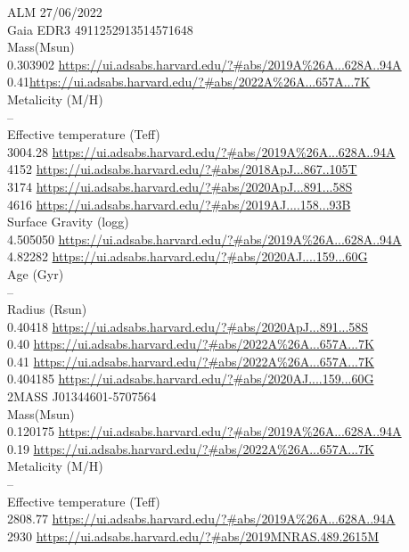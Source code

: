 ALM 27/06/2022\\
Gaia EDR3 4911252913514571648\\
Mass(Msun)\\
0.303902 \url{https://ui.adsabs.harvard.edu/?#abs/2019A%26A...628A..94A}\\
0.41\url{https://ui.adsabs.harvard.edu/?#abs/2022A%26A...657A...7K}\\
Metalicity (M/H)\\
--\\
Effective temperature (Teff) \\
3004.28 \url{https://ui.adsabs.harvard.edu/?#abs/2019A%26A...628A..94A}\\
4152 \url{https://ui.adsabs.harvard.edu/?#abs/2018ApJ...867..105T}\\
3174 \url{https://ui.adsabs.harvard.edu/?#abs/2020ApJ...891...58S}\\
4616 \url{https://ui.adsabs.harvard.edu/?#abs/2019AJ....158...93B}\\
Surface Gravity (logg) \\
4.505050 \url{https://ui.adsabs.harvard.edu/?#abs/2019A%26A...628A..94A}\\
4.82282 \url{https://ui.adsabs.harvard.edu/?#abs/2020AJ....159...60G}\\
Age (Gyr)\\
--\\
Radius (Rsun)\\
0.40418 \url{https://ui.adsabs.harvard.edu/?#abs/2020ApJ...891...58S}\\
0.40 \url{https://ui.adsabs.harvard.edu/?#abs/2022A%26A...657A...7K}\\
0.41 \url{https://ui.adsabs.harvard.edu/?#abs/2022A%26A...657A...7K}\\
0.404185 \url{https://ui.adsabs.harvard.edu/?#abs/2020AJ....159...60G}\\
2MASS J01344601-5707564\\
Mass(Msun)\\
0.120175 \url{https://ui.adsabs.harvard.edu/?#abs/2019A%26A...628A..94A}\\
0.19 \url{https://ui.adsabs.harvard.edu/?#abs/2022A%26A...657A...7K}\\
Metalicity (M/H)\\
--\\
Effective temperature (Teff) \\
2808.77 \url{https://ui.adsabs.harvard.edu/?#abs/2019A%26A...628A..94A}\\
2930 \url{https://ui.adsabs.harvard.edu/?#abs/2019MNRAS.489.2615M}\\
